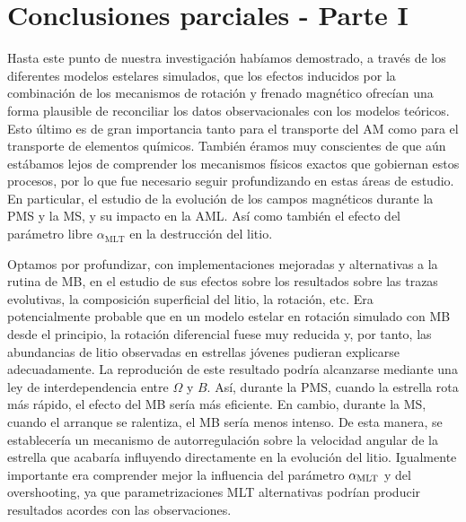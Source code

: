 \section{Conclusiones parciales - Parte I} \label{sec_conclusions_i}
Hasta este punto de nuestra investigación habíamos demostrado, a través de los diferentes modelos estelares simulados, que los efectos inducidos por la combinación de los mecanismos de rotación y frenado magnético ofrecían una forma plausible de reconciliar los datos observacionales con los modelos teóricos. Esto último es de gran importancia tanto para el transporte del AM como para el transporte de elementos químicos. También éramos muy conscientes de que aún estábamos lejos de comprender los mecanismos físicos exactos que gobiernan estos procesos, por lo que fue necesario seguir profundizando en estas áreas de estudio. En particular, el estudio de la evolución de los campos magnéticos durante la PMS y la MS, y su impacto en la AML. Así como también el efecto del parámetro libre $\alpha_\mathrm{MLT}$ en la destrucción del litio. \par

Optamos por profundizar, con implementaciones mejoradas y alternativas a la rutina de MB, en el estudio de sus efectos sobre los resultados sobre las trazas evolutivas, la composición superficial del litio, la rotación, etc. Era potencialmente probable que en un modelo estelar en rotación simulado con MB desde el principio, la rotación diferencial fuese muy reducida y, por tanto, las abundancias de litio observadas en estrellas jóvenes pudieran explicarse adecuadamente. La reprodución de este resultado podría alcanzarse mediante una ley de interdependencia entre $\Omega$ y $B$. Así, durante la PMS, cuando la estrella rota más rápido, el efecto del MB sería más eficiente. En cambio, durante la MS, cuando el arranque se ralentiza, el MB sería menos intenso. De esta manera, se establecería un mecanismo de autorregulación sobre la velocidad angular de la estrella que acabaría influyendo directamente en la evolución del litio. Igualmente importante era comprender mejor la influencia del parámetro $\alpha_{\mathrm{MLT}}$ y del overshooting, ya que parametrizaciones MLT alternativas podrían producir resultados acordes con las observaciones.\par

